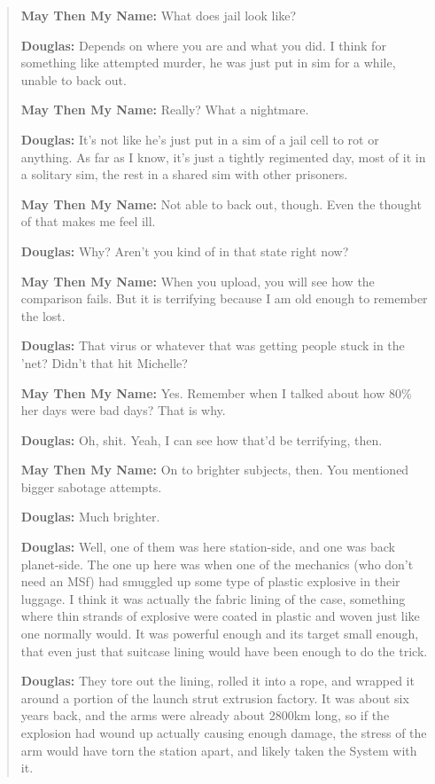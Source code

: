 \begin{quote}
\textbf{May Then My Name:} What does jail look like?

\textbf{Douglas:} Depends on where you are and what you did. I think for something like attempted murder, he was just put in sim for a while, unable to back out.

\textbf{May Then My Name:} Really? What a nightmare.

\textbf{Douglas:} It's not like he's just put in a sim of a jail cell to rot or anything. As far as I know, it's just a tightly regimented day, most of it in a solitary sim, the rest in a shared sim with other prisoners.

\textbf{May Then My Name:} Not able to back out, though. Even the thought of that makes me feel ill.

\textbf{Douglas:} Why? Aren't you kind of in that state right now?

\textbf{May Then My Name:} When you upload, you will see how the comparison fails. But it is terrifying because I am old enough to remember the lost.

\textbf{Douglas:} That virus or whatever that was getting people stuck in the 'net? Didn't that hit Michelle?

\textbf{May Then My Name:} Yes. Remember when I talked about how 80\% her days were bad days? That is why.

\textbf{Douglas:} Oh, shit. Yeah, I can see how that'd be terrifying, then.

\textbf{May Then My Name:} On to brighter subjects, then. You mentioned bigger sabotage attempts.

\textbf{Douglas:} Much brighter.

\textbf{Douglas:} Well, one of them was here station-side, and one was back planet-side. The one up here was when one of the mechanics (who don't need an MSf) had smuggled up some type of plastic explosive in their luggage. I think it was actually the fabric lining of the case, something where thin strands of explosive were coated in plastic and woven just like one normally would. It was powerful enough and its target small enough, that even just that suitcase lining would have been enough to do the trick.

\textbf{Douglas:} They tore out the lining, rolled it into a rope, and wrapped it around a portion of the launch strut extrusion factory. It was about six years back, and the arms were already about 2800km long, so if the explosion had wound up actually causing enough damage, the stress of the arm would have torn the station apart, and likely taken the System with it.


\end{quote}
